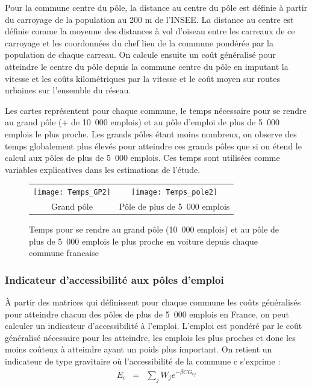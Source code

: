\documentclass[10.5pt,a4paper]{article}
\begin{document}
{Pour la commune centre du pôle, la distance au centre du pôle est définie à partir du carroyage de la population au 200 m de l'INSEE. La distance au centre est définie comme la moyenne des distances à vol d'oiseau entre les carreaux de ce carroyage et les coordonnées du chef lieu de la commune pondérée par la population de chaque carreau. On calcule ensuite un coût généralisé pour atteindre le centre du pôle depuis la commune centre du pôle en imputant la vitesse et les coûts kilométriques par la vitesse et le coût moyen sur routes urbaines sur l'ensemble du réseau. \par

Les cartes représentent pour chaque commune, le temps nécessaire pour se rendre au grand pôle (+ de 10~000 emplois) et au pôle d'emploi de plus de 5~000 emplois le plus proche. Les grands pôles étant moins nombreux, on observe des temps globalement plus élevés pour atteindre ces grands pôles que si on étend le calcul aux pôles de plus de 5~000 emplois. Ces temps sont utilisées comme variables explicatives dans les estimations de l'étude.\par 

\begin{figure}[h!]%
\caption{Temps pour se rendre au grand pôle (10~000 emplois) et au pôle de plus de 5~000 emplois le plus proche en voiture depuis chaque commune francaise }
\begin{tabular}{cc}
\texttt{[image: Temps\_GP2]}  & \texttt{[image: Temps\_pole2]}  \\
Grand pôle & Pôle de plus de 5~000 emplois
\end{tabular}
\label{distance_GPole}%
\end{figure}

\subsubsection{Indicateur d'accessibilité aux pôles d'emploi}

\`{A} partir des matrices qui définissent pour chaque commune les coûts généralisés pour atteindre chacun des pôles de plus de 5~000 emplois en France, on peut calculer un indicateur d'accessibilité à l'emploi. L'emploi est pondéré par le coût généralisé nécessaire pour les atteindre, les emplois les plus proches et donc les moins coûteux à atteindre ayant un poids plus important. On retient un indicateur de type gravitaire où l'accessibilité de la commune c s'exprime :
\begin{eqnarray*}
E_c & = & \sum_j W_j e^{-\beta CG_{cj}}
\end{eqnarray*}

}
\end{document}
